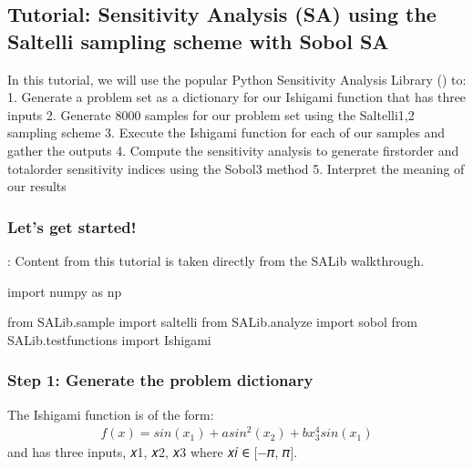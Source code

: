 \documentclass[letterpaper,10pt,english]{book}
\begin{document}
\subsection{Tutorial: Sensitivity Analysis (SA) using the Saltelli sampling scheme with Sobol SA}
\label{\detokenize{A2_Jupyter_Notebooks:tutorial-sensitivity-analysis-sa-using-the-saltelli-sampling-scheme-with-sobol-sa}}
\sphinxAtStartPar
In this tutorial, we will use the popular Python Sensitivity Analysis
Library ()
to: 1. Generate a problem set as a dictionary for our Ishigami function
that has three inputs 2. Generate 8000 samples for our problem set using
the Saltelli1,2 sampling scheme 3. Execute the Ishigami function for
each of our samples and gather the outputs 4. Compute the sensitivity
analysis to generate first\sphinxhyphen{}order and total\sphinxhyphen{}order sensitivity indices
using the Sobol3 method 5. Interpret the meaning of our results


\subsubsection{Let’s get started!}
\label{\detokenize{A2_Jupyter_Notebooks:lets-get-started}}
\sphinxAtStartPar
{}: Content from this tutorial is taken directly from the SALib
walkthrough.

\begin{sphinxVerbatim}[commandchars=\\\{\}]
import numpy as np

from SALib.sample import saltelli
from SALib.analyze import sobol
from SALib.test\PYGZus{}functions import Ishigami
\end{sphinxVerbatim}


\subsubsection{Step 1: Generate the problem dictionary}
\label{\detokenize{A2_Jupyter_Notebooks:step-1-generate-the-problem-dictionary}}
\sphinxAtStartPar
The Ishigami function is of the form:
\begin{equation*}
\begin{split}f(x) = sin(x_1)+asin^2(x_2)+bx_3^4sin(x_1)\end{split}
\end{equation*}
\sphinxAtStartPar
and has three inputs, 𝑥1, 𝑥2, 𝑥3 where 𝑥𝑖 ∈ {[}−𝜋, 𝜋{]}.
\end{document}
